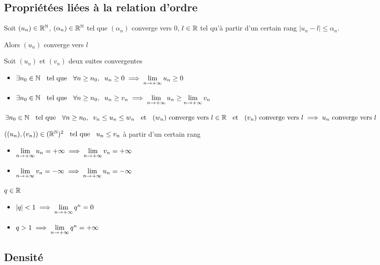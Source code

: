 \subsection{Propriétées liées à la relation d'ordre}

\begin{prp}
Soit $(u_n) \in \mathbb{R}^{\mathbb{N}}$, $(\alpha_n) \in \mathbb{R}^{\mathbb{N}}$ tel que 
$(\alpha_n)$ converge vers $0$, $l \in \mathbb{R}$ tel qu'à partir
d'un certain rang $|u_n - l| \leq \alpha_n$.

Alors $(u_n)$ converge vers $l$
\end{prp}


\begin{prp}
Soit $(u_n)$ et $(v_n)$ deux suites convergentes
\begin{itemize}
    \item $\exists n_0 \in \mathbb{N} \;\;\text{ tel que }\;\; \forall n \geq n_0, \;\; u_n \geq 0
    \implies \lim\limits_{n \to +\infty} u_n \geq 0$
    \item $\exists n_0 \in \mathbb{N} \;\;\text{ tel que }\;\; \forall n \geq n_0, \;\; u_n \geq v_n
    \implies \lim\limits_{n \to +\infty} u_n \geq \lim\limits_{n \to +\infty} v_n$
\end{itemize}
\end{prp}

\begin{thm}[d'encadrement]
$\apcr v_n \leq u_n \leq w_n \et (w_n) \text{ \cv vers } l \in \R
\et (v_n) \text{ \cv vers } l \implies u_n \text{ \cv vers } l$
\end{thm}

\begin{prp}
$((u_n), (v_n)) \in (\mathbb{R}^{\mathbb{N}})^2 \;\;\text{ tel que }\;\; u_n \leq v_n$ à partir d'un certain rang
\begin{itemize}
    \item $\lim\limits_{n \to +\infty} u_n = +\infty \implies \lim\limits_{n \to +\infty} v_n = +\infty$
    \item $\lim\limits_{n \to +\infty} v_n = -\infty \implies \lim\limits_{n \to +\infty} u_n = -\infty$
\end{itemize}
\end{prp}

\begin{cor}
$q \in \mathbb{R}$
\begin{itemize}
    \item $|q| < 1 \implies \lim\limits_{n \to +\infty} q^n = 0$
    \item $q > 1 \implies \lim\limits_{n \to +\infty} q^n = +\infty$
\end{itemize}
\end{cor}

\subsection{Densité}

